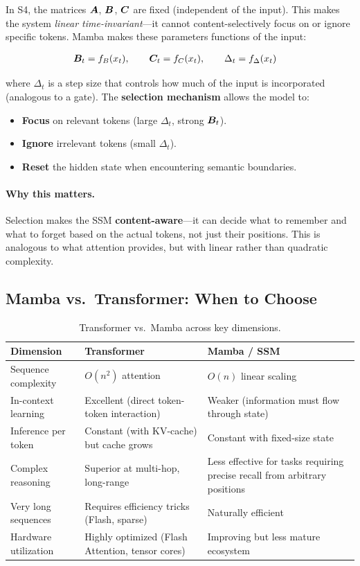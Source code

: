 In S4, the matrices $\bm{A}$, $\bm{B}$, $\bm{C}$ are fixed (independent of the input).
This makes the system \emph{linear time-invariant}---it cannot
content-selectively focus on or ignore specific tokens.  Mamba makes these
parameters functions of the input:

\begin{align}
\bm{B}_t &= f_B(x_t), \qquad \bm{C}_t = f_C(x_t), \qquad \Delta_t = f_\Delta(x_t)
\label{eq:mamba_selective}
\end{align}

where $\Delta_t$ is a step size that controls how much of the input is
incorporated (analogous to a gate).  The \textbf{selection mechanism} allows
the model to:
\begin{itemize}[leftmargin=*]
\item \textbf{Focus} on relevant tokens (large $\Delta_t$, strong $\bm{B}_t$).
\item \textbf{Ignore} irrelevant tokens (small $\Delta_t$).
\item \textbf{Reset} the hidden state when encountering semantic boundaries.
\end{itemize}

\paragraph{Why this matters.}
Selection makes the SSM \textbf{content-aware}---it can decide what to
remember and what to forget based on the actual tokens, not just their
positions.  This is analogous to what attention provides, but with linear
rather than quadratic complexity.

\subsection{Mamba vs.\ Transformer: When to Choose}

\begin{table}[H]
\centering
\small
\begin{tabularx}{\textwidth}{@{}l X X@{}}
\toprule
\textbf{Dimension} & \textbf{Transformer} & \textbf{Mamba / SSM} \\
\midrule
Sequence complexity & $O(n^2)$ attention & $O(n)$ linear scaling \\
In-context learning & Excellent (direct token-token interaction)
  & Weaker (information must flow through state) \\
Inference per token & Constant (with KV-cache) but cache grows
  & Constant with fixed-size state \\
Complex reasoning & Superior at multi-hop, long-range & Less effective
  for tasks requiring precise recall from arbitrary positions \\
Very long sequences & Requires efficiency tricks (Flash, sparse)
  & Naturally efficient \\
Hardware utilization & Highly optimized (Flash Attention, tensor cores)
  & Improving but less mature ecosystem \\
\bottomrule
\end{tabularx}
\caption{Transformer vs.\ Mamba across key dimensions.}
\label{tab:transformer_vs_mamba}
\end{table}


